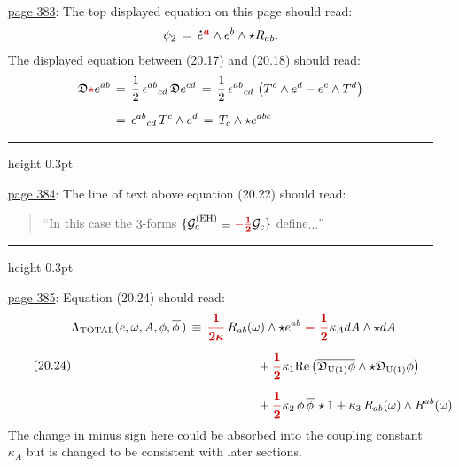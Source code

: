 \documentclass[12pt]{GeomPhysBOOK}
\newcommand\correct[1]{{\color{red!80!black}\bf #1}}
\newcommand\mcorrect[1]{{\color{red!80!black}\bm{#1}}}
\newcommand\listrule{\vspace{0.2cm}\hrule height 0.3pt}
\begin{document}
\begin{enumerate}[leftmargin=1.9cm,labelwidth=1.4cm,itemsep=0.5cm]
		\begin{quote}
			``$\ldots$of the interior operator $i_{c}\,\equiv\,i_{\mcorrect{X_{c}}}$,$\ldots$''\\
		\end{quote}
	\listrule
	\item[\underline{page 383}:] 	
		The top displayed equation on this page should read:
		\begin{align*}
			\psi_{2} \,=\, \varye{\mcorrect{a}}\w e^{b} \w \star R_{ab}. 
		\end{align*}
		The displayed equation between (20.17) and (20.18) should read:
		\begin{align*}
			\GLD\correct{\star} e^{ab} &\,=\, \frac{1}{2}\,\epsilon^{ab}{}_{cd}\,\GLD e^{cd} \,=\, \frac{1}{2}\,\epsilon^{ab}{}_{cd}\,\left(T^{c} \w e^{d} - e^{c}\w T^{d} \right) \\[0.2cm]
				&\,=\, \epsilon^{ab}{}_{cd}\,T^{c} \w e^{d} \,=\, T_{c}\w \star e^{abc}
		\end{align*}
	\listrule
	\item[\underline{page 384}:] 	
		The line of text above equation (20.22) should read:
		\begin{quote}
			``In this case the $3$-forms $\{\EINEHFM{c}\equiv\correct{-\frac{1}{2}}\EINFM{c}\}$ define$\ldots$''\\
		\end{quote}
	\listrule
	\item[\underline{page 385}:] 	
		Equation (20.24) should read:
		\begin{align}\tag{20.24}
			\begin{split}
				\Lambda_{\text{TOTAL}}(e,\omega,A,\phi,\phibar\,) &\,\equiv\, \mcorrect{\frac{1}{2\kappa}}\,R_{ab}(\omega) \w \star e^{ab} \;\mcorrect{-}\;\mcorrect{\frac{1}{2}} \kappa_{A}dA \w \star dA  \\[0.2cm]
					& \hspace{2cm} + \mcorrect{\frac{1}{2}}\kappa_{1}\text{Re}\left( \overline{\GLD_{\text{U}(1)}\phi} \w \star \GLD_{\text{U}(1)}\phi \right) \\[0.2cm]
					& \hspace{2cm} + \mcorrect{\frac{1}{2}}\kappa_{2}\,\phi\,\phibar\,\star 1 + \kappa_{3}\,R_{ab}(\omega) \w R^{ab}(\omega)
			\end{split}		
		\end{align}
		The change in minus sign here could be absorbed into the coupling constant $\kappa_{A}$ but is changed to be consistent with later sections. \\

\end{enumerate}
\end{document}
